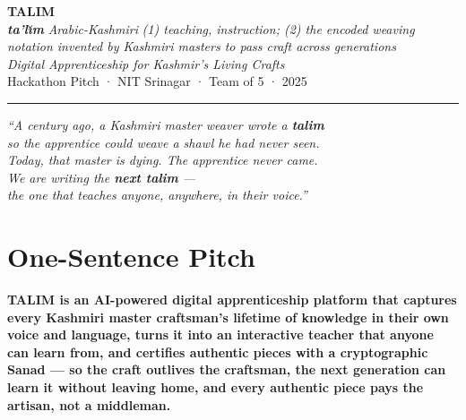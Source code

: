 \documentclass[11pt, a4paper]{article}
\begin{document}

\begin{center}
  {\fontsize{40}{44}\selectfont\bfseries\color{lapis} TALIM}\\[2pt]
  {\small\color{saffron}\itshape\textbf{ta'l\u{\i}m}\,\textbar\,Arabic-Kashmiri\,\textbar\,(1) teaching, instruction; (2) the encoded weaving notation invented by Kashmiri masters to pass craft across generations}\\[10pt]
  {\Large\color{walnut}\itshape Digital Apprenticeship for Kashmir's Living Crafts}\\[10pt]
  {\small\color{muted} Hackathon Pitch · NIT Srinagar · Team of 5 · 2025}
\end{center}

\vspace{0.4em}
\noindent\color{rule}\rule{\linewidth}{1.5pt}
\vspace{0.6em}

\begin{heroquote}
\centering
\itshape\large\color{walnut}
``A century ago, a Kashmiri master weaver wrote a {\bfseries\color{saffron}talim} \\
so the apprentice could weave a shawl he had never seen. \\[3pt]
Today, that master is dying. The apprentice never came. \\[3pt]
We are writing the {\bfseries\color{saffron}next talim} — \\
the one that teaches anyone, anywhere, in their voice.''
\end{heroquote}

\section{One-Sentence Pitch}

\begin{uspbox}
\textbf{TALIM is an AI-powered digital apprenticeship platform that captures every Kashmiri master craftsman's lifetime of knowledge in their own voice and language, turns it into an interactive teacher that anyone can learn from, and certifies authentic pieces with a cryptographic Sanad — so the craft outlives the craftsman, the next generation can learn it without leaving home, and every authentic piece pays the artisan, not a middleman.}
\end{uspbox}
\end{document}
